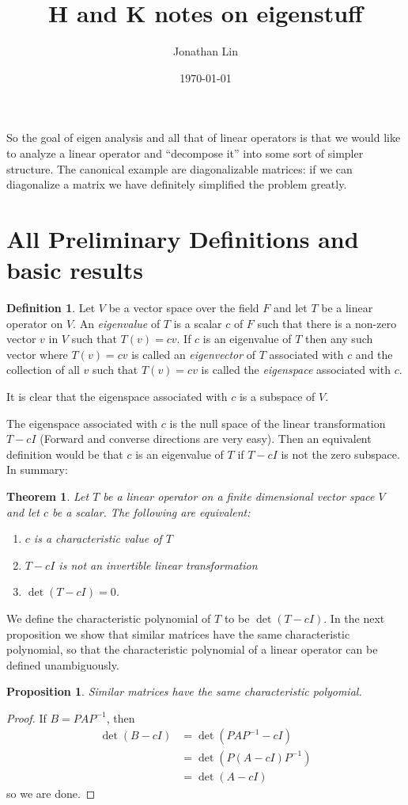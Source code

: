\documentclass[12pt]{article}
\title{H and K notes on eigenstuff}
\author{Jonathan Lin}
\date{\today}
\theoremstyle{plain}
\newtheorem{thm}{Theorem}
\newtheorem{prop}{Proposition}
\theoremstyle{definition}
\newtheorem{defn}{Definition}
\begin{document}
\maketitle

So the goal of eigen analysis and all that of linear operators is that we would like to analyze a linear operator and ``decompose it'' into some sort of simpler structure. The canonical example are diagonalizable matrices: if we can diagonalize a matrix we have definitely simplified the problem greatly.
\section{All Preliminary Definitions and basic results}

\begin{defn}
Let $V$ be a vector space over the field $F$ and let $T$ be a linear operator on $V$. An \textit{eigenvalue} of $T$ is a scalar $c$ of $F$ such that there is a non-zero vector $v$ in $V$ such that $T(v) = cv$. If $c$ is an eigenvalue of $T$ then any such vector where $T(v) = cv$ is called an \textit{eigenvector} of $T$ associated with $c$ and the collection of all $v$ such that $T(v) = cv$ is called the \textit{eigenspace} associated with $c$.
\end{defn}

It is clear that the eigenspace associated with $c$ is a subspace of $V$.

The eigenspace associated with $c$ is the null space of the linear transformation $T - cI$ (Forward and converse directions are very easy). Then an equivalent definition would be that $c$ is an eigenvalue of $T$ if $T - cI$ is not the zero subspace. In summary:

\begin{thm}
Let $T$ be a linear operator on a finite dimensional vector space $V$ and let $c$ be a scalar. The following are equivalent:
\begin{enumerate}
	\item $c$ is a characteristic value of $T$
	\item $T - cI$ is not an invertible linear transformation
	\item $\det(T - cI) = 0$.
\end{enumerate}
\end{thm}

We define the characteristic polynomial of $T$ to be $\det(T - cI)$. In the next proposition we show that similar matrices have the same characteristic polynomial, so that the characteristic polynomial of a linear operator can be defined unambiguously.
\begin{prop}
	Similar matrices have the same characteristic polyomial.
\end{prop}
\begin{proof}
	If $B = PAP^{-1}$, then
	\begin{align*}
		\det(B - cI) &= \det(PAP^{-1} - cI) \\
						&= \det(P(A - cI)P^{-1}) \\
						&= \det(A - cI)
	\end{align*}
	so we are done.
\end{proof}
\end{document}
